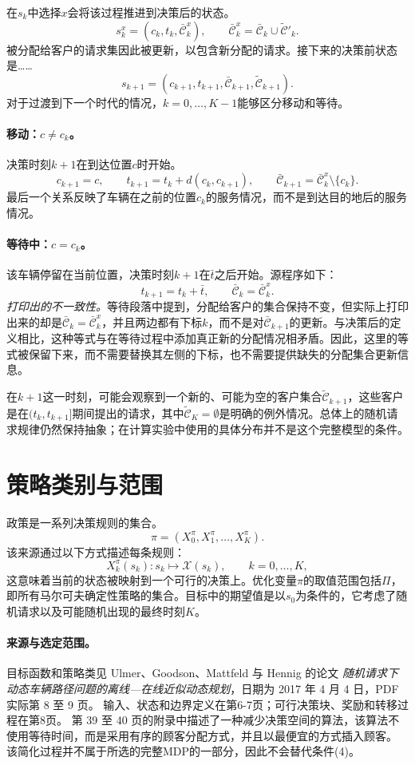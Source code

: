\documentclass{article}
\begin{document}
在$s_k$中选择$x$会将该过程推进到决策后的状态。
\[
s_k^x=(c_k,t_k,\bar{\mathcal{C}}_k^x),
\qquad
\bar{\mathcal{C}}_k^x
=\bar{\mathcal{C}}_k\cup\tilde{\mathcal{C}}'_k.
\]
被分配给客户的请求集因此被更新，以包含新分配的请求。接下来的决策前状态是……
\[
s_{k+1}=(c_{k+1},t_{k+1},\bar{\mathcal{C}}_{k+1},
\tilde{\mathcal{C}}_{k+1}).
\]
对于过渡到下一个时代的情况，$k=0,\ldots,K-1$能够区分移动和等待。

\paragraph{移动：$c\neq c_k$。}
决策时刻$k+1$在到达位置$c$时开始。
\[
c_{k+1}=c,\qquad
 t_{k+1}=t_k+d(c_k,c_{k+1}),\qquad
 \bar{\mathcal{C}}_{k+1}
 =\bar{\mathcal{C}}_k^x\setminus\{c_k\}.
\]
最后一个关系反映了车辆在之前的位置$c_k$的服务情况，而不是到达目的地后的服务情况。

\paragraph{等待中：$c=c_k$。}
该车辆停留在当前位置，决策时刻$k+1$在$\bar t$之后开始。源程序如下：
\[
t_{k+1}=t_k+\bar t,\qquad
\bar{\mathcal{C}}_k=\bar{\mathcal{C}}_k^x.
\]
\emph{打印出的不一致性。}等待段落中提到，分配给客户的集合保持不变，但实际上打印出来的却是$\bar{\mathcal{C}}_k=\bar{\mathcal{C}}_k^x$，并且两边都有下标$k$，而不是对$\bar{\mathcal{C}}_{k+1}$的更新。与决策后的定义相比，这种等式与在等待过程中添加真正新的分配情况相矛盾。因此，这里的等式被保留下来，而不需要替换其左侧的下标，也不需要提供缺失的分配集合更新信息。

在$k+1$这一时刻，可能会观察到一个新的、可能为空的客户集合$\tilde{\mathcal{C}}_{k+1}$，这些客户是在$(t_k,t_{k+1}]$期间提出的请求，其中$\tilde{\mathcal{C}}_K=\emptyset$是明确的例外情况。总体上的随机请求规律仍然保持抽象；在计算实验中使用的具体分布并不是这个完整模型的条件。

\section*{策略类别与范围}

政策是一系列决策规则的集合。
\[
\pi=(X_0^{\pi},X_1^{\pi},\ldots,X_K^{\pi}).
\]
该来源通过以下方式描述每条规则：
\[
X_k^{\pi}(s_k):s_k\mapsto\mathcal{X}(s_k),
\qquad k=0,\ldots,K,
\]
这意味着当前的状态被映射到一个可行的决策上。优化变量$\pi$的取值范围包括$\Pi$，即所有马尔可夫确定性策略的集合。目标中的期望值是以$s_0$为条件的，它考虑了随机请求以及可能随机出现的最终时刻$K$。

\paragraph{来源与选定范围。}
目标函数和策略类见 Ulmer、Goodson、Mattfeld 与 Hennig 的论文 \emph{随机请求下动态车辆路径问题的离线—在线近似动态规划}，日期为 2017 年 4 月 4 日，PDF 实际第 8 至 9 页。 输入、状态和边界定义在第6-7页；可行决策块、奖励和转移过程在第8页。 第 39 至 40 页的附录中描述了一种减少决策空间的算法，该算法不使用等待时间，而是采用有序的顾客分配方式，并且以最便宜的方式插入顾客。 该简化过程并不属于所选的完整MDP的一部分，因此不会替代条件(4)。
\end{document}
